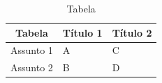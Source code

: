 \begin{table}[!h]
    \caption{Tabela}\label{tab:tabela}
    \centering
    \begin{tabular}{l|l|l}
    \hline
    \multicolumn{1}{c|}{\textbf{Tabela}} & \multicolumn{1}{c|}{\textbf{Título 1}} & \multicolumn{1}{c}{\textbf{Título 2}} \\ \hline
    Assunto 1                            & A                                      & C                                     \\ \hline
    Assunto 2                            & B                                      & D                                     \\ \hline
    \end{tabular}
\end{table}

